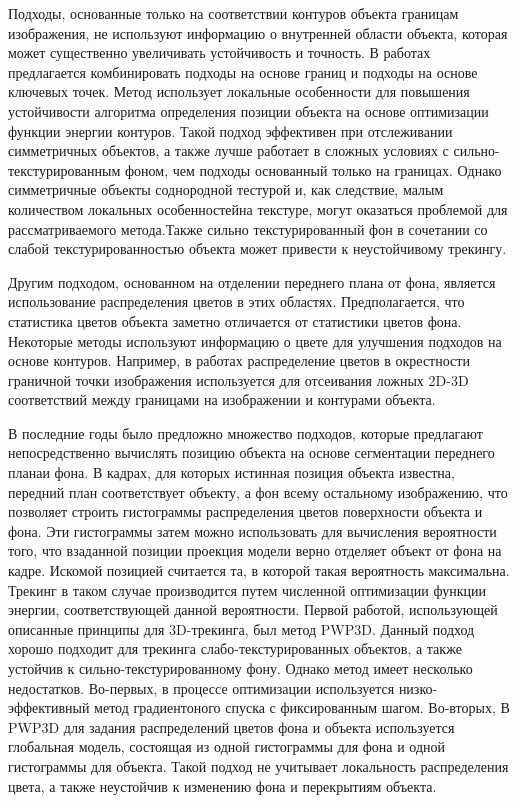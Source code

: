 Подходы, основанные только на соответствии контуров объекта границам
изображения,
не используют информацию о внутренней области объекта, которая может
существенно
увеличивать устойчивость и точность. В работах
\cite{VacchettiEdges2004,ChoiFeaturesAndEdges,Bugaev_2018_ECCV} предлагается
комбинировать подходы на основе границ и подходы на основе ключевых точек.
Метод
\cite{Bugaev_2018_ECCV} использует локальные особенности для повышения
устойчивости алгоритма определения позиции объекта на основе оптимизации
функции
энергии контуров. Такой подход эффективен при отслеживании симметричных
объектов, а также лучше работает в сложных условиях с сильно-текстурированным
фоном, чем подходы основанный только на границах. Однако симметричные объекты
соднородной тестурой и, как следствие, малым количеством локальных
особенностейна текстуре, могут оказаться проблемой для рассматриваемого
метода.Также
сильно
текстурированный фон в сочетании со слабой текстурированностью объекта может
привести к неустойчивому трекингу.

Другим подходом, основанном на отделении переднего плана от фона,
является использование распределения цветов в этих областях. Предполагается,
что
статистика цветов объекта заметно отличается от статистики цветов фона.
Некоторые методы \cite{SeoHinterstoisser2014,WangZhong2015,Zhong2018}
используют
информацию о цвете для улучшения подходов на основе контуров. Например, в
работах \cite{SeoHinterstoisser2014,WangZhong2015} распределение цветов в
окрестности граничной точки изображения используется для отсеивания ложных
2D-3D
соответствий между границами на изображении и контурами объекта.

В последние годы было предложно множество подходов, которые предлагают
непосредственно вычислять позицию объекта на основе сегментации переднего
планаи фона. В кадрах, для которых истинная позиция объекта известна, передний
план
соответствует объекту, а фон всему остальному изображению, что позволяет
строить гистограммы распределения цветов поверхности объекта и фона.
Эти гистограммы затем можно использовать для вычисления вероятности того, что
взаданной позиции проекция модели верно отделяет объект от фона на кадре.
Искомой позицией считается та, в которой такая вероятность максимальна.
Трекинг в таком случае производится путем численной оптимизации функции
энергии, соответствующей данной вероятности.
Первой работой, использующей описанные принципы для 3D-трекинга,
был метод PWP3D\cite{PWP3D}. Данный подход хорошо подходит для трекинга
слабо-текстурированных объектов, а также устойчив к сильно-текстурированному
фону. Однако метод имеет несколько недостатков.
Во-первых, в процессе оптимизации используется низко-эффективный метод
градиентоного спуска с фиксированным шагом. Во-вторых, В PWP3D для задания
распределений цветов фона и объекта используется глобальная модель, состоящая
из
одной гистограммы для фона и одной гистограммы для объекта. Такой подход не
учитывает локальность распределения цвета, а также неустойчив к изменению фона
и
перекрытиям объекта.


